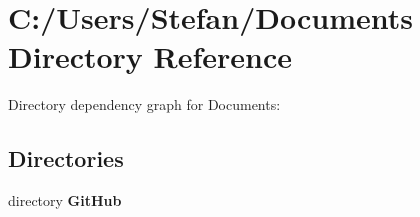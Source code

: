 \section{C\+:/\+Users/\+Stefan/\+Documents Directory Reference}
\label{dir_34b8779e384de29838acab2b8c72ef92}
Directory dependency graph for Documents\+:
\subsection*{Directories}
\begin{DoxyCompactItemize}
\item 
directory {\bf Git\+Hub}
\end{DoxyCompactItemize}
